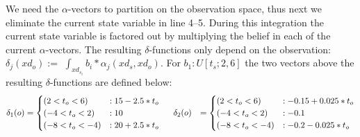 \documentclass{article} %
\begin{document}
We need the $\alpha$-vectors to partition on the observation space, thus next we eliminate the current state variable in line 4--5. During this integration the current state variable is factored out by multiplying the belief in each of the current $\alpha$-vectors.  The resulting $\delta$-functions only depend on the observation: $\delta_{j}(xd_o) := $ $\int_{xd_{s_i}} b_i * \alpha_j(xd_s,xd_o)$.
For $b_1: U[t_s;2,6]$ the two vectors above the resulting $\delta$-functions are defined below: 
{\footnotesize
\begin{align}
\delta_{1}(o) &= 
\begin{cases}
 (2<t_o<6) &: 15 - 2.5*t_o \\
(-4<t_o<2) &: 10 \\
(-8<t_o<-4) &: 20 + 2.5*t_o 
\end{cases}
\hspace{5mm} 
\delta_{2}(o) &= \begin{cases}
 (2<t_o<6) &: -0.15 + 0.025*t_o \\
(-4<t_o<2) &: -0.1 \\
(-8<t_o<-4) &: -0.2 - 0.025*t_o 
\end{cases}
\nonumber
\end{align}
}
\end{document}
